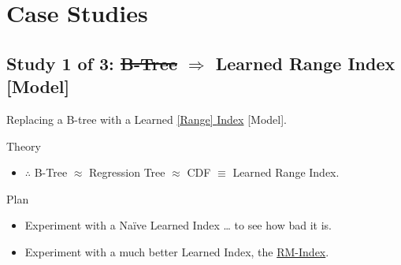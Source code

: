 \documentclass[presentation]{beamer}
\begin{document}
\section{Case Studies}
\label{sec:orgd0b7891}
\subsection{Study 1 of 3: \sout{B-Tree} \(\Rightarrow\) Learned Range Index [Model]}
\label{sec:org8a8dfdd}
Replacing a B-tree with a \alert{Learned} \uline{[Range] \alert{Index}} [Model].
\begin{frame}[label={sec:org8581bf0}]{Theory}
\begin{itemize}
\item \(\therefore\) \alert{B-Tree} \(\approx\) Regression Tree \(\approx\) CDF \(\equiv\) \alert{Learned Range Index}.
\end{itemize}
\end{frame}
\begin{frame}[label={sec:orgdfd13d6}]{Plan}
\begin{itemize}
\item Experiment with a Naïve Learned Index
\ldots{} to see how bad it is.
\item Experiment with a much better Learned Index, the \uline{RM-Index}.
\end{itemize}
\end{frame}
\end{document}

